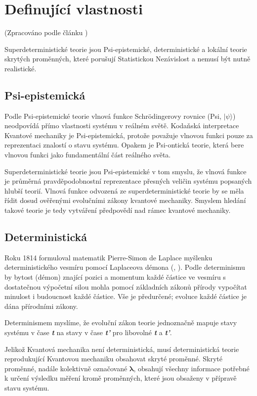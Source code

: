 \section{Definující vlastnosti}
(Zpracováno podle článku \cite{supdet:rethink})

Superdeterministické teorie jsou Psi-epistemické, deterministické a lokální teorie skrytých proměnných, které porušují Statistickou Nezávislost a nemusí být nutně realistické.

\subsection{Psi-epistemická}
Podle Psi-epistemické teorie vlnová funkce Schrödingerovy rovnice (Psi, $|\psi\rangle$) neodpovídá přímo vlastnosti systému v reálném světě. Kodaňská interpretace Kvantové mechaniky je Psi-epistemická, protože považuje vlnovou funkci pouze za reprezentaci znalostí o stavu systému. Opakem je Psi-ontická teorie, která bere vlnovou funkci jako fundamentální část reálného světa.

Superdeterministické teorie jsou Psi-epistemické v tom smyslu, že vlnová funkce je průměrná pravděpodobnostní reprezentace přesných veličin systému popsaných hlubší teorií. Vlnová funkce odvozená ze superdeterministické teorie by se měla řídit dosud ověřenými evolučními zákony kvantové mechaniky. Smyslem hledání takové teorie je tedy vytváření předpovědí nad rámec kvantové mechaniky.

\subsection{Deterministická}
Roku 1814 formuloval matematik Pierre-Simon de Laplace myšlenku deterministického vesmíru pomocí Laplaceova démona (, \cite*{laplace:demon}). Podle determinismu by bytost (démon) znající pozici a momentum každé částice ve vesmíru s dostatečnou výpočetní silou mohla pomocí základních zákonů přírody vypočítat minulost i budoucnost každé částice. Vše je předurčené; evoluce každé částice je dána přírodními zákony.

Determinismem myslíme, že evoluční zákon teorie jednoznačně mapuje stavy systému v čase \textbf{\emph{t}} na stavy v čase \textbf{\emph{t'}} pro libovolné \textbf{\emph{t}} a \textbf{\emph{t'}}.

Jelikož Kvantová mechanika není deterministická, musí deterministická teorie reprodukující Kvantovou mechaniku obsahovat skryté proměnné. Skryté proměnné, nadále kolektivně označované $\bm{\lambda}$, obsahují všechny informace potřebné k určení výsledku měření kromě  proměnných, které jsou obsaženy v přípravě stavu systému.

